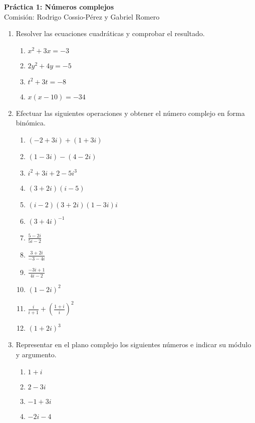 \documentclass[a4paper]{article}
\newcommand{\exercise}{\item}
\newcommand{\df}[2]{\displaystyle\frac{#1}{#2}}
\begin{document}
\noindent \hrulefill 
\vspace{-7pt}
\begin{center} 
	\textbf{ Práctica 1: Números complejos } \\
	Comisión: Rodrigo Cossio-Pérez y Gabriel Romero
\end{center}
\vspace{-10pt}
\hrulefill
\begin{enumerate}
	\exercise Resolver las ecuaciones cuadráticas y comprobar el resultado.
	\begin{multicols}{2}
	\begin{enumerate} [label=(\alph*)]
		\item $x^2+3x=-3$
		\item $2y^2+4y=-5$
		\item $t^2+3t=-8$
		\item $x(x-10)=-34$
	\end{enumerate}
	\end{multicols}
	\exercise Efectuar las siguientes operaciones y obtener el número complejo en forma binómica.
	\begin{multicols}{2}
	\begin{enumerate} [label=(\alph*)]
		\item $(-2+3i)+(1+3i)$
		\item $(1-3i)-(4-2i)$
		\item $i^2+3i+2-5i^3$
		\item $(3+2i)(i-5)$
		\item $(i-2)(3+2i)(1-3i)i$
		\item $(3+4i)^{-1}$
		\item $\df{5-2i}{5i-2}$
		\item $\df{3+2i}{-3-4i}$
		\item $\df{-3i+1}{4i-2}$
		\item $(1-2i)^2$
		\item $\df{i}{i+1}+\left(\df{1+i}{i}\right)^2$
		\item $(1+2i)^3$
	\end{enumerate}
	\end{multicols}
	\exercise Representar en el plano complejo los siguientes números e indicar su módulo y argumento.
	\begin{multicols}{3}
	\begin{enumerate} [label=(\alph*)]
		\item $1+i$
		\item $2-3i$
		\item $-1+3i$
		\item $-2i-4$

\end{enumerate}
\end{multicols}
\end{enumerate}
\end{document}
